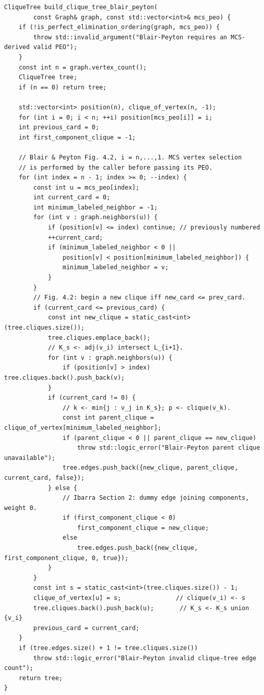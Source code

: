 \documentclass[11pt,a4paper,oneside]{report}
\theoremstyle{plain}
\theoremstyle{definition}
\theoremstyle{remark}
\DeclareRobustCommand{\file}[1]{\mtp_breakable_tt:n {#1}}
\begin{document}
\begin{lstlisting}[style=cpp,firstnumber=9,caption={\file{src/clique_tree_blair_peyton.cpp}, lines 9--67: Blair--Peyton clique tree with dummy edges.},label={lst:bp}]
CliqueTree build_clique_tree_blair_peyton(
        const Graph& graph, const std::vector<int>& mcs_peo) {
    if (!is_perfect_elimination_ordering(graph, mcs_peo)) {
        throw std::invalid_argument("Blair-Peyton requires an MCS-derived valid PEO");
    }
    const int n = graph.vertex_count();
    CliqueTree tree;
    if (n == 0) return tree;

    std::vector<int> position(n), clique_of_vertex(n, -1);
    for (int i = 0; i < n; ++i) position[mcs_peo[i]] = i;
    int previous_card = 0;
    int first_component_clique = -1;

    // Blair & Peyton Fig. 4.2, i = n,...,1. MCS vertex selection
    // is performed by the caller before passing its PEO.
    for (int index = n - 1; index >= 0; --index) {
        const int u = mcs_peo[index];
        int current_card = 0;
        int minimum_labeled_neighbor = -1;
        for (int v : graph.neighbors(u)) {
            if (position[v] <= index) continue; // previously numbered
            ++current_card;
            if (minimum_labeled_neighbor < 0 ||
                position[v] < position[minimum_labeled_neighbor]) {
                minimum_labeled_neighbor = v;
            }
        }
        // Fig. 4.2: begin a new clique iff new_card <= prev_card.
        if (current_card <= previous_card) {
            const int new_clique = static_cast<int>(tree.cliques.size());
            tree.cliques.emplace_back();
            // K_s <- adj(v_i) intersect L_{i+1}.
            for (int v : graph.neighbors(u)) {
                if (position[v] > index) tree.cliques.back().push_back(v);
            }
            if (current_card != 0) {
                // k <- min{j : v_j in K_s}; p <- clique(v_k).
                const int parent_clique = clique_of_vertex[minimum_labeled_neighbor];
                if (parent_clique < 0 || parent_clique == new_clique)
                    throw std::logic_error("Blair-Peyton parent clique unavailable");
                tree.edges.push_back({new_clique, parent_clique, current_card, false});
            } else {
                // Ibarra Section 2: dummy edge joining components, weight 0.
                if (first_component_clique < 0)
                    first_component_clique = new_clique;
                else
                    tree.edges.push_back({new_clique, first_component_clique, 0, true});
            }
        }
        const int s = static_cast<int>(tree.cliques.size()) - 1;
        clique_of_vertex[u] = s;               // clique(v_i) <- s
        tree.cliques.back().push_back(u);       // K_s <- K_s union {v_i}
        previous_card = current_card;
    }
    if (tree.edges.size() + 1 != tree.cliques.size())
        throw std::logic_error("Blair-Peyton invalid clique-tree edge count");
    return tree;
}
\end{lstlisting}
\end{document}
